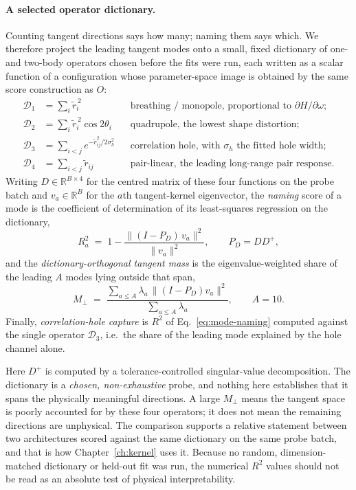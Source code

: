 \paragraph{A selected operator dictionary.}
Counting tangent directions says how many; naming them says which. We therefore project the
leading tangent modes onto a small, fixed dictionary of one- and two-body operators chosen
before the fits were run, each written as a scalar function of a configuration whose
parameter-space image is obtained by the same score construction as $O$:
\begin{equation}
\begin{aligned}
  \mathcal{D}_1 &= \textstyle\sum_i \tilde r_i^{\,2}
    &&\text{breathing / monopole, proportional to $\partial H/\partial\omega$;}\\
  \mathcal{D}_2 &= \textstyle\sum_i \tilde r_i^{\,2}\cos 2\theta_i
    &&\text{quadrupole, the lowest shape distortion;}\\
  \mathcal{D}_3 &= \textstyle\sum_{i<j} e^{-\tilde r_{ij}^{2}/2\sigma_h^{2}}
    &&\text{correlation hole, with $\sigma_h$ the fitted hole width;}\\
  \mathcal{D}_4 &= \textstyle\sum_{i<j} \tilde r_{ij}
    &&\text{pair-linear, the leading long-range pair response.}
\end{aligned}
\label{eq:dictionary}
\end{equation}
Writing $D\in\mathbb{R}^{B\times4}$ for the centred matrix of these four functions on the
probe batch and $v_a\in\mathbb{R}^{B}$ for the $a$th tangent-kernel eigenvector, the
\emph{naming} score of a mode is the coefficient of determination of its least-squares
regression on the dictionary,
\begin{equation}
  R^2_a \;=\; 1-\frac{\|(I-P_D)\,v_a\|^2}{\|v_a\|^2},
  \qquad P_D=DD^+,
  \label{eq:mode-naming}
\end{equation}
and the \emph{dictionary-orthogonal tangent mass} is the eigenvalue-weighted share of the
leading $A$ modes lying outside that span,
\begin{equation}
  M_\perp \;=\; \frac{\sum_{a\le A}\lambda_a\,\|(I-P_D)v_a\|^2}{\sum_{a\le A}\lambda_a},
  \qquad A=10 .
  \label{eq:nonphys-mass}
\end{equation}
Finally, \emph{correlation-hole capture} is $R^2$ of Eq.~\eqref{eq:mode-naming} computed
against the single operator $\mathcal{D}_3$, i.e.\ the share of the leading mode explained
by the hole channel alone.

Here $D^+$ is computed by a tolerance-controlled singular-value decomposition. The
dictionary is a \emph{chosen, non-exhaustive} probe, and nothing here establishes that
it spans the physically meaningful directions. A large $M_\perp$ means the tangent space is
poorly accounted for by these four operators; it does not mean the remaining directions are
unphysical. The comparison supports a relative statement between two architectures
scored against the same dictionary on the same probe batch, and that is how
Chapter~\ref{ch:kernel} uses it. Because no random, dimension-matched dictionary or held-out
fit was run, the numerical $R^2$ values should not be read as an absolute test of physical
interpretability.

